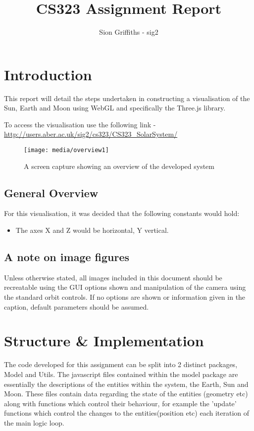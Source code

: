 \documentclass[titlepage]{article}
\title{CS323 Assignment Report}
\author{Sion Griffiths - sig2}
\begin{document}
\maketitle
\tableofcontents




\newpage
\section{Introduction}

This report will detail the steps undertaken in constructing a visualisation of the Sun, Earth and Moon using WebGL and specifically the Three.js library.

To access the visualisation use the following link -  \url{http://users.aber.ac.uk/sig2/cs323/CS323\_SolarSystem/}


\begin{figure}[h!]
                \centering
                \texttt{[image: media/overview1]}
                \caption{A screen capture showing an overview of the developed system}
                \label{fig:basic_model}
            \end{figure}

\subsection{General Overview}
For this visualisation, it was decided that the following constants would hold:
\begin{itemize}
\item The axes X and Z would be horizontal, Y vertical.
\end{itemize}

\subsection{A note on image figures}
Unless otherwise stated, all images included in this document should be recreatable using the GUI options shown and manipulation of the camera using the standard orbit controls. If no options are shown or information given in the caption, default parameters should be assumed.
\section{Structure \& Implementation}
The code developed for this assignment can be split into 2 distinct packages, Model and Utils. The javascript files contained within the model package are essentially the descriptions of the entities within the system, the Earth, Sun and Moon. These files contain data regarding the state of the entities (geometry etc) along with functions which control their behaviour, for example the 'update' functions which control the changes to the entities(position etc) each iteration of the main logic loop.
\end{document}
